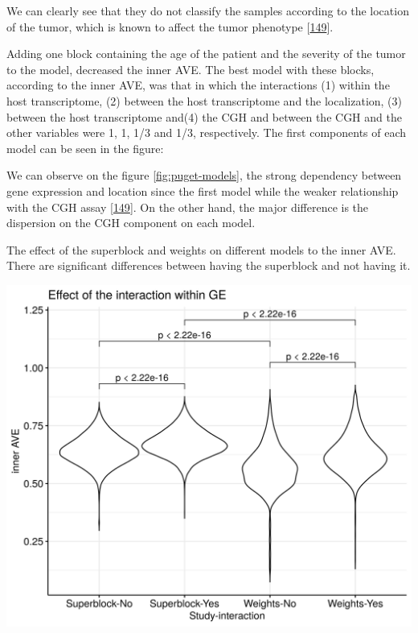 \documentclass[
  a4paper,
]{book}
\let\origfigure\figure
\let\endorigfigure\endfigure
\renewenvironment{figure}[1][2] {
    \expandafter\origfigure\expandafter[!ht]
} {
    \endorigfigure
}
\begin{document}
We can clearly see that they do not classify the samples according to the location of the tumor, which is known to affect the tumor phenotype {[}\protect\hyperlink{ref-puget2012}{149}{]}.

Adding one block containing the age of the patient and the severity of the tumor to the model, decreased the inner AVE.
The best model with these blocks, according to the inner AVE, was that in which the interactions (1) within the host transcriptome, (2) between the host transcriptome and the localization, (3) between the host transcriptome and(4) the CGH and between the CGH and the other variables were 1, 1, 1/3 and 1/3, respectively.
The first components of each model can be seen in the figure:

We can observe on the figure \ref{fig:puget-models}, the strong dependency between gene expression and location since the first model while the weaker relationship with the CGH assay {[}\protect\hyperlink{ref-puget2012}{149}{]}.
On the other hand, the major difference is the dispersion on the CGH component on each model.

The effect of the superblock and weights on different models to the inner AVE.
There are significant differences between having the superblock and not having it.

\begin{figure}
\includegraphics[width=1\linewidth]{images/pugets-weights} \caption[Effect of superblock and weights on the inner AVE on Puget's dataset.]{Effect of superblock and weights on the inner AVE on Puget's dataset. Designs with the superblock showed higher inner AVe scores than without it. Interaction yes/no indicates RNA and RNA interaction.}\label{fig:puget-weights}
\end{figure}
\end{document}
